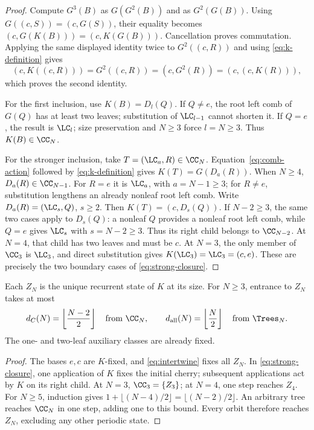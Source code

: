 \begin{proof}
Compute \(G^3(B)\) as \(G(G^2(B))\) and as \(G^2(G(B))\).
Using \(G((c,S))=(c,G(S))\), their equality becomes
\((c,G(K(B)))=(c,K(G(B)))\). Cancellation proves commutation.
Applying the same displayed identity twice to \(G^2((c,R))\)
and using \eqref{eq:k-definition} gives
\[
 (c,K((c,R)))=G^2((c,R))=(c,G^2(R))=(c,(c,K(R))),
\]
which proves the second identity.

For the first inclusion, use \(K(B)=D_l(Q)\).
If \(Q\ne e\), the root left comb of \(G(Q)\) has at least two leaves;
substitution of \(\LC_{l-1}\) cannot shorten it. If \(Q=e\), the result
is \(\LC_l\); size preservation and \(N\ge3\) force \(l=N\ge3\).
Thus \(K(B)\in\CC_N\).

For the stronger inclusion, take \(T=(\LC_a,R)\in\CC_N\).
Equation~\eqref{eq:comb-action} followed by
\eqref{eq:k-definition} gives
\(K(T)=G(D_a(R))\).
When \(N\ge4\), \(D_a(R)\in\CC_{N-1}\).
For \(R=e\) it is \(\LC_a\), with \(a=N-1\ge3\);
for \(R\ne e\), substitution lengthens an already nonleaf root left comb.
Write \(D_a(R)=(\LC_s,Q)\), \(s\ge2\). Then
\(K(T)=(c,D_s(Q))\). If \(N-2\ge3\), the same two cases apply to
\(D_s(Q)\): a nonleaf \(Q\) provides a nonleaf root left comb, while
\(Q=e\) gives \(\LC_s\) with \(s=N-2\ge3\).
Thus its right child belongs to \(\CC_{N-2}\).
At \(N=4\), that child has two leaves and must be \(c\).
At \(N=3\), the only member of \(\CC_3\) is \(\LC_3\), and direct
substitution gives \(K(\LC_3)=\LC_3=(c,e)\).
These are precisely the two boundary cases of \eqref{eq:strong-closure}.
\end{proof}

\begin{proposition}\label{prop:k-clock}
Each \(Z_N\) is the unique recurrent state of \(K\) at its size.
For \(N\ge3\), entrance to \(Z_N\) takes at most
\[
 d_C(N)=\left\lfloor\frac{N-2}{2}\right\rfloor
 \quad\text{from }\CC_N,\qquad
 d_{\mathrm{all}}(N)=\left\lfloor\frac N2\right\rfloor
 \quad\text{from }\Trees_N.
\]
The one- and two-leaf auxiliary classes are already fixed.
\end{proposition}

\begin{proof}
The bases \(e,c\) are \(K\)-fixed, and \eqref{eq:intertwine} fixes all
\(Z_N\). In \eqref{eq:strong-closure}, one application of \(K\) fixes the
initial cherry; subsequent applications act by \(K\) on its right child.
At \(N=3\), \(\CC_3=\{Z_3\}\); at \(N=4\), one step reaches \(Z_4\).
For \(N\ge5\), induction gives
\(1+\lfloor(N-4)/2\rfloor=\lfloor(N-2)/2\rfloor\).
An arbitrary tree reaches \(\CC_N\) in one step, adding one to this
bound. Every orbit therefore reaches \(Z_N\), excluding any other
periodic state.
\end{proof}
